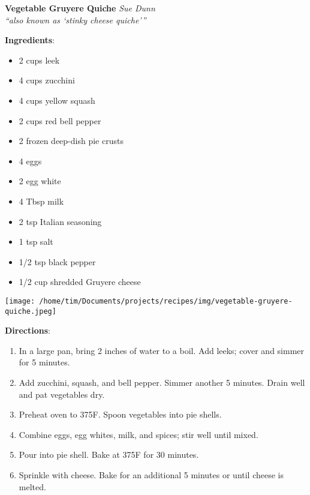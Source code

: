 \documentclass[11pt, twoside, openany]{book}
\begin{document}
\noindent\begin{minipage}[t]{\linewidth}%
{\Large\textbf{Vegetable Gruyere Quiche}} \label{vegetable-gruyere-quiche}\hfill\textit{Sue Dunn}\\
\textit{``also known as `stinky cheese quiche'''}\\
\noindent\begin{minipage}[t]{0.78\linewidth}%
\textbf{Ingredients}:\vspace{-3mm}
\begin{multicols}{2}
\begin{itemize}\setlength\itemsep{-1mm}
\item 2 cups leek
\item 4 cups zucchini
\item 4 cups yellow squash
\item 2 cups red bell pepper
\item 2 frozen deep-dish pie crusts
\item 4 eggs
\item 2 egg white
\item 4 Tbsp milk
\item 2 tsp Italian seasoning
\item 1 tsp salt
\item 1/2 tsp black pepper
\item 1/2 cup shredded Gruyere cheese
\end{itemize}
\end{multicols}
\end{minipage}
\noindent\begin{minipage}[t]{0.18\linewidth}
\centering \strut\vspace*{-\baselineskip}\newline
\texttt{[image: /home/tim/Documents/projects/recipes/img/vegetable-gruyere-quiche.jpeg]}\\
\end{minipage}\vspace{3mm}
\textbf{Directions}:
\vspace{-3mm}\begin{enumerate}\setlength\itemsep{-1mm}
\item In a large pan, bring 2 inches of water to a boil. Add leeks; cover and simmer for 5 minutes.
\item Add zucchini, squash, and bell pepper. Simmer another 5 minutes. Drain well and pat vegetables dry.
\item Preheat oven to 375F. Spoon vegetables into pie shells.
\item Combine eggs, egg whites, milk, and spices; stir well until mixed.
\item Pour into pie shell. Bake at 375F for 30 minutes.
\item Sprinkle with cheese. Bake for an additional 5 minutes or until cheese is melted.
\end{enumerate}
\end{minipage}\vspace{8mm}
\end{document}
